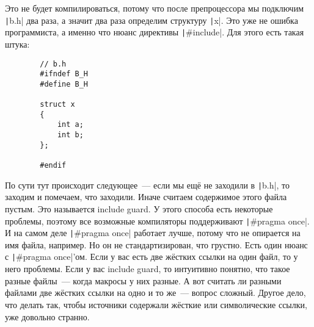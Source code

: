 \documentclass{article}
\begin{document}
    Это не будет компилироваться, потому что после препроцессора мы подключим \texttt|b.h| два раза, а значит два раза определим структуру \texttt|x|. Это уже не ошибка программиста, а именно что нюанс директивы \texttt|#include|. Для этого есть такая штука:
    \begin{verbatim}
        // b.h
        #ifndef B_H
        #define B_H

        struct x
        {
            int a;
            int b;
        };

        #endif
    \end{verbatim}
    По сути тут происходит следующее~--- если мы ещё не заходили в \texttt|b.h|, то заходим и помечаем, что заходили. Иначе считаем содержимое этого файла пустым. Это называется include guard. У этого способа есть некоторые проблемы, поэтому все возможные компиляторы поддерживают \texttt|#pragma once|. И на самом деле \texttt|#pragma once| работает лучше, потому что не опирается на имя файла, например. Но он не стандартизирован, что грустно. Есть один нюанс с \texttt|#pragma once|'ом. Если у вас есть две жёстких ссылки на один файл, то у него проблемы. Если у вас include guard, то интуитивно понятно, что такое разные файлы~--- когда макросы у них разные. А вот считать ли разными файлами две жёстких ссылки на одно и то же~--- вопрос сложный. Другое дело, что делать так, чтобы источники содержали жёсткие или символические ссылки, уже довольно странно.
\end{document}
